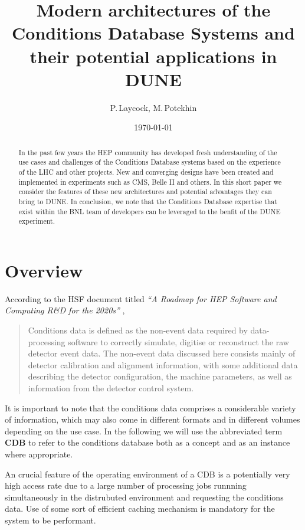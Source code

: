 \documentclass[pdftex,12pt,letter]{article}
\title{Modern architectures of the Conditions Database Systems and their potential applications in DUNE}
\date{\today}
\author{P.\,Laycock, M.\,Potekhin}
\begin{document}
\maketitle

\begin{abstract}
\noindent  In the past few years the HEP community has developed fresh understanding of
the use cases and challenges of the Conditions Database systems based on the experience
of the LHC and other projects. New and converging designs have been created and
implemented in experiments such as CMS, Belle II and others. In this short paper we consider the features
of these new architectures and potential advantages they can bring to DUNE. In conclusion,
we note that the Conditions Database expertise that exist within the BNL team of developers
can be leveraged to the benfit of the DUNE experiment.

\end{abstract}


\section{Overview}
According to  the HSF document titled \textit{``A Roadmap for HEP Software and Computing R\&D for the 2020s''} \cite{hsf_roadmap},
\begin{quote}
Conditions data is defined as the non-event data required by data-processing software to correctly simulate,
digitise or reconstruct the raw detector event data. The non-event data discussed here consists mainly of
detector calibration and alignment information, with some additional data describing the detector configuration,
the machine parameters, as well as information from the detector control system.
\end{quote}
\noindent It is important to note that the conditions data comprises a considerable variety of information,
which may also come in different formats and in different volumes depending on the use case. In the following
we will use the abbreviated term \textbf{CDB } to refer to the conditions database both as a concept and as an
instance where appropriate.

An crucial feature of the operating environment of a CDB is a potentially very high access rate due to a large
 number of processing jobs runnning simultaneously in the distrubuted environment and requesting the conditions
data. Use of some sort of efficient caching mechanism is mandatory for the system to be performant.
\end{document}
